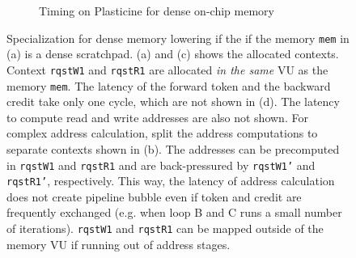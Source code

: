 \begin{figure}
\begin{subfigure}[b]{1\textwidth}
\caption{Timing on Plasticine for dense on-chip memory}
\end{subfigure}
\caption[Dense specialization]{
  Specialization for dense memory lowering if the if the memory \texttt{mem} in 
   (a) is a dense scratchpad.
  (a) and (c) shows the allocated contexts.
  Context \texttt{rqstW1} and \texttt{rqstR1} are allocated \emph{in the same} VU as the memory
  \texttt{mem}. The latency of 
  the forward token and the backward credit take only one cycle, which are not shown in (d).
  The latency to compute read and write addresses are also not shown.
  For complex address calculation, \name split the address computations to separate contexts shown
  in (b). The addresses can be precomputed in \texttt{rqstW1} and \texttt{rqstR1} and are back-pressured by 
  \texttt{rqstW1'} and \texttt{rqstR1'}, respectively. This way, the latency of address calculation does
  not create pipeline bubble even if token and credit are frequently exchanged (e.g. when loop B and C
  runs a small number of iterations).
  \texttt{rqstW1} and \texttt{rqstR1} can be mapped outside of the memory VU if running out of address
  stages.
}
\label{fig:densespecial}
\end{figure}

